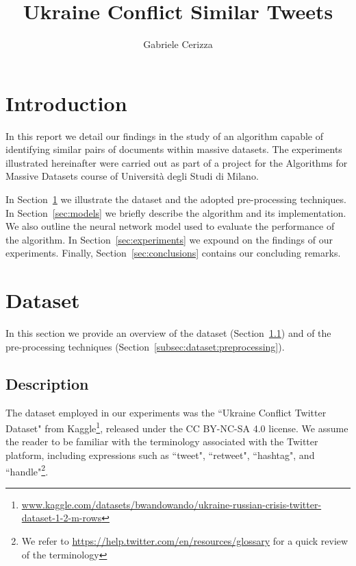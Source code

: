 \documentclass[runningheads]{llncs}
\begin{document}
\title{
    Ukraine Conflict Similar Tweets
}
\author{Gabriele Cerizza}


\maketitle

\section*{Introduction}
\label{sec:introduction}

In this report we detail our findings in the study of an algorithm capable of identifying similar pairs of documents within massive datasets. The experiments illustrated hereinafter were carried out as part of a project for the Algorithms for Massive Datasets course of Università degli Studi di Milano.

In Section~\ref{sec:dataset} we illustrate the dataset and the adopted pre-processing techniques. In Section~\ref{sec:models} we briefly describe the algorithm and its implementation. We also outline the neural network model used to evaluate the performance of the algorithm. In Section~\ref{sec:experiments} we expound on the findings of our experiments. Finally, Section~\ref{sec:conclusions} contains our concluding remarks.

\section{Dataset}
\label{sec:dataset}

In this section we provide an overview of the dataset (Section~\ref{subsec:dataset:description}) and of the pre-processing techniques (Section~\ref{subsec:dataset:preprocessing}).

\subsection{Description}
\label{subsec:dataset:description}

The dataset employed in our experiments was the “Ukraine Conflict Twitter Dataset" from Kaggle\footnote{\url{www.kaggle.com/datasets/bwandowando/ukraine-russian-crisis-twitter-dataset-1-2-m-rows}}, released under the CC BY-NC-SA 4.0 license. We assume the reader to be familiar with the terminology associated with the Twitter platform, including expressions such as “tweet", “retweet", “hashtag", and “handle"\footnote{We refer to \url{https://help.twitter.com/en/resources/glossary} for a quick review of the terminology}.
\end{document}
